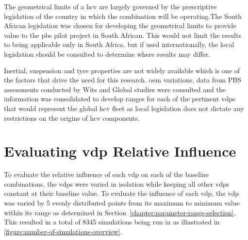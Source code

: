 The geometrical limits of a \gls{hcv} are largely governed by the prescriptive legislation of the country in which the combination will be operating.The South African legislation was chosen for developing the geometrical limits to provide value to the \gls{pbs} pilot project in South African. This would not limit the results to being applicable only in South Africa, but if used internationally, the local legislation should be consulted to determine where results may differ.

Inertial, suspension and tyre properties are not widely available which is one of the factors that drive the need for this research. \gls{oem} variations, data from PBS assessments conducted by Wits and Global studies were consulted and the information was consolidated to develop ranges for each of the pertinent \glspl{vdp} that would represent the global \gls{hcv} fleet as local legislation does not dictate any restrictions on the origins of \gls{hcv} components.

\section{Evaluating \gls{vdp} Relative Influence}

To evaluate the relative influence of each \gls{vdp} on each of the baseline combinations, the \glspl{vdp} were varied in isolation while keeping all other \glspl{vdp} constant at their baseline value. To evaluate the influence of each \gls{vdp}, the \gls{vdp} was varied by 5 evenly distributed points from its maximum to minimum value within its range as determined in Section~\ref{chapter:parameter-range-selection}. This resulted in a total of 8345 simulations being run in \trucksim{} as illustrated in \ref{figure:number-of-simulations-overview}.

